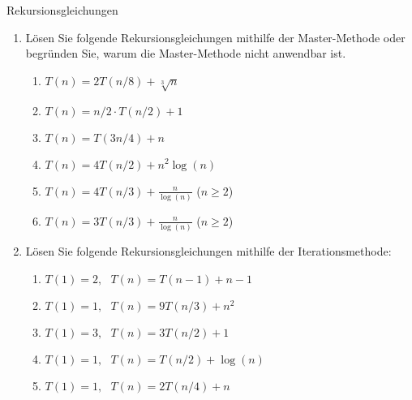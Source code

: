 \documentclass[11pt,a4paper]{article}
\begin{document}
\thispagestyle{empty}




\begin{aufgabe}{1}{Rekursionsgleichungen}
\begin{enumerate}
    \item Lösen Sie folgende Rekursionsgleichungen mithilfe der Master-Methode oder begründen Sie, warum die Master-Methode nicht anwendbar ist.
    \begin{enumerate}[label=\roman*)]
        \item $T(n) = 2T(n / 8) + \sqrt[3]{n}$
        \item $T(n) = n / 2 \cdot T(n / 2) + 1$
        \item $T(n) = T(3n / 4) + n$
        \item $T(n) = 4T(n / 2) + n^2 \log(n)$
        \item $T(n) = 4T(n / 3) + \frac{n}{\log(n)}$ ($n \geq 2$)
        \item \hard $T(n) = 3T(n / 3) + \frac{n}{\log(n)}$ ($n \geq 2$)
    \end{enumerate}

    \item Lösen Sie folgende Rekursionsgleichungen mithilfe der Iterationsmethode:
    \begin{enumerate}[label=\roman*)]
        \item $T(1) = 2, \,\,\,\, T(n) = T(n - 1) + n - 1$
        \item $T(1) = 1, \,\,\,\, T(n) = 9T(n / 3) + n^2$
        \item $T(1) = 3, \,\,\,\, T(n) = 3T(n / 2) + 1$
        \item $T(1) = 1, \,\,\,\, T(n) = T(n / 2) + \log(n)$
        \item $T(1) = 1, \,\,\,\, T(n) = 2T(n / 4) + n$
    \end{enumerate}


\end{enumerate}
\end{aufgabe}
\end{document}
